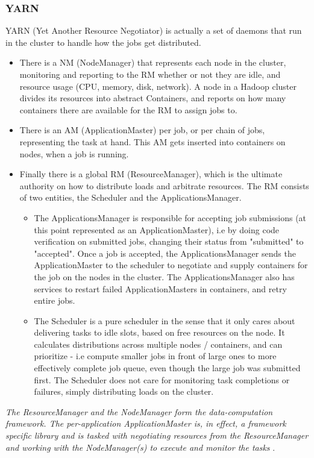 \documentclass[a4paper,english]{report}
\begin{document}
		\subsubsection{YARN}
		YARN (Yet Another Resource Negotiator) is actually a set of daemons that run in the cluster to handle how the jobs get distributed. 
		\begin{itemize}
			\item There is a NM (NodeManager) that represents each node in the cluster, monitoring and reporting to the RM whether or not they are idle, and resource usage (CPU, memory, disk, network). A node in a Hadoop cluster divides its resources into abstract Containers, and reports on how many containers there are available for the RM to assign jobs to.
			\item There is an AM (ApplicationMaster) per job, or per chain of jobs, representing the task at hand. This AM gets inserted into containers on nodes, when a job is running.
			\item Finally there is a global RM (ResourceManager), which is the ultimate authority on how to distribute loads and arbitrate resources. The RM consists of two entities, the Scheduler and the ApplicationsManager.
			\begin{itemize}	
				\item The ApplicationsManager is responsible for accepting job submissions (at this point represented as an ApplicationMaster), i.e by doing code verification on submitted jobs, changing their status from "submitted" to "accepted". Once a job is accepted, the ApplicationsManager sends the ApplicationMaster to the scheduler to negotiate and supply containers for the job on the nodes in the cluster. The ApplicationsManager also has services to restart failed ApplicationMasters in containers, and retry entire jobs.
				\item The Scheduler is a pure scheduler in the sense that it only cares about delivering tasks to idle slots, based on free resources on the node. It calculates distributions across multiple nodes / containers, and can prioritize - i.e compute smaller jobs in front of large ones to more effectively complete job queue, even though the large job was submitted first. The Scheduler does not care for monitoring task completions or failures, simply distributing loads on the cluster.
			\end{itemize}
		\end{itemize}
		\textit{The ResourceManager and the NodeManager form the data-computation framework. The per-application ApplicationMaster is, in effect, a framework specific library and is tasked with negotiating resources from the ResourceManager and working with the NodeManager(s) to execute and monitor the tasks} \cite{yarn}.
		
\end{document}
